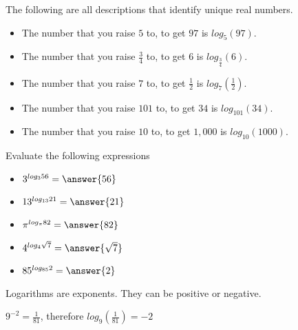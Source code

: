 \documentclass{ximera}
\begin{document}
\begin{example}
The following are all descriptions that identify unique real numbers.

\begin{itemize}
\item The number that you raise $5$ to, to get $97$ is $log_5(97)$. \\
\item The number that you raise $\frac{3}{4}$ to, to get $6$ is $log_{\tfrac{3}{4}}(6)$. \\
\item The number that you raise $7$ to, to get $\frac{1}{2}$ is $log_7\left(\frac{1}{2}\right)$. \\
\item The number that you raise $101$ to, to get $34$ is $log_{101}(34)$. \\
\item The number that you raise $10$ to, to get $1,000$ is $log_{10}(1000)$. \\
\end{itemize}

\end{example}



\begin{example}
Evaluate the following expressions

\begin{itemize}
\item  $3^{log_3{56}} = \answer{56}$
\item  $13^{log_{13}{21}} = \answer{21}$
\item  $\pi^{log_{\pi}{82}} = \answer{82}$
\item  $4^{log_4{\sqrt{7}}} = \answer{\sqrt{7}}$
\item  $85^{log_{85}{2}} = \answer{2}$

\end{itemize}

\end{example}












Logarithms are exponents.  They can be positive or negative.



$9^{-2} = \frac{1}{81}$, therefore  $log_{9}\left(\frac{1}{81}\right) = -2$
\end{document}
